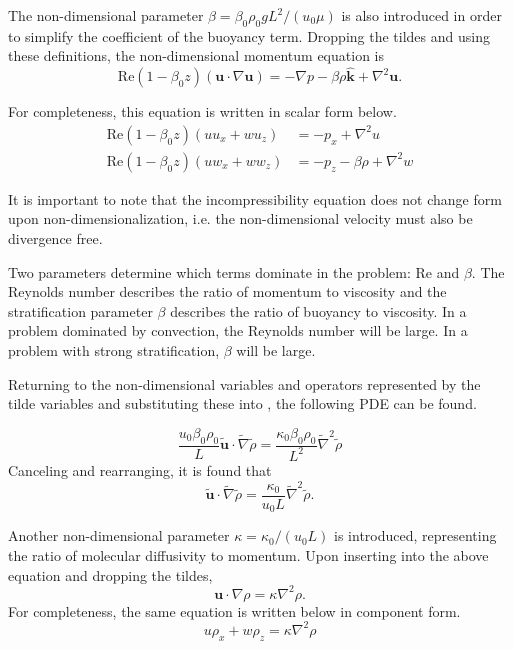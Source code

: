 \documentclass[12pt]{article}
\begin{document}
The non-dimensional parameter $\beta=\beta_0\rho_0gL^2/(u_0\mu)$ is also introduced in order to simplify the coefficient of the buoyancy term. Dropping the tildes and using these definitions, the non-dimensional momentum equation is
\begin{equation}
\text{Re}(1-\beta_0z)(\mathbf{u}\cdot\nabla\mathbf{u})=-\nabla p-\beta\rho\mathbf{\hat{k}}+\nabla^2\mathbf{u}.
\end{equation}

For completeness, this equation is written in scalar form below.
\begin{align}
\label{eq:nondimns_1}
\text{Re}(1-\beta_0z)(uu_x+wu_z)&=-p_x+\nabla^2u\\
\label{eq:nondimns_2}
\text{Re}(1-\beta_0z)(uw_x+ww_z)&=-p_z-\beta\rho +\nabla^2w
\end{align}

It is important to note that the incompressibility equation does not change form upon non-dimensionalization, i.e. the non-dimensional velocity must also be divergence free.

Two parameters determine which terms dominate in the problem: Re and $\beta$. The Reynolds number describes the ratio of momentum to viscosity and the stratification parameter $\beta$ describes the ratio of buoyancy to viscosity. In a problem dominated by convection, the Reynolds number will be large. In a problem with strong stratification, $\beta$ will be large.

Returning to the non-dimensional variables and operators represented by the tilde variables and substituting these into , the following PDE can be found.

\begin{equation}
\frac{u_0\beta_0\rho_0}{L}\mathbf{\tilde{u}}\cdot\tilde{\nabla}\tilde{\rho}=\frac{\kappa_0\beta_0\rho_0}{L^2}\tilde{\nabla}^2\tilde{\rho}
\end{equation}
Canceling and rearranging, it is found that
\begin{equation}
\mathbf{\tilde{u}}\cdot\tilde{\nabla}\tilde{\rho}=\frac{\kappa_0}{u_0L}\tilde{\nabla}^2\tilde{\rho}.
\end{equation}

Another non-dimensional parameter $\kappa=\kappa_0/(u_0L)$ is introduced, representing the ratio of molecular diffusivity to momentum. Upon inserting into the above equation and dropping the tildes,
\begin{equation}
\mathbf{u}\cdot\nabla\rho=\kappa\nabla^2\rho.
\end{equation}
For completeness, the same equation is written below in component form.
\begin{equation}
\label{eq:nondimadveccomponent}
u\rho_x+w\rho_z=\kappa\nabla^2\rho
\end{equation}
\end{document}
